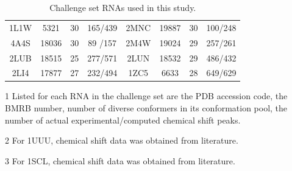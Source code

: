 \documentclass[journal=jcisd8,manuscript=article,layout=onecolumn]{achemso}
\begin{document}
\begin{table}[h!]
\begin{threeparttable}
\begin{tabular}{c c c c | c c c c}
1L1W & 5321  & 30 & 165/439 & 2MNC & 19887 & 30 & 100/248 \\
4A4S & 18036 & 30 & 89 /157 & 2M4W & 19024 & 29 & 257/261 \\
2LUB & 18515 & 25 & 277/571 & 2LUN & 18532 & 29 & 486/432 \\
2LI4 & 17877 & 27 & 232/494 & 1ZC5 & 6633  & 28 & 649/629 \\
\hline
\end{tabular}
\begin{tablenotes}
\item[1] Listed for each RNA in the challenge set are the PDB accession code, the BMRB number, number of diverse conformers in its conformation pool, the number of actual experimental/computed chemical shift peaks.
\item[2] For 1UUU, chemical shift data was obtained from literature\cite{sich1997structure}.
\item[3] For 1SCL, chemical shift data was obtained from literature\cite{szewczak1995sarcin}.

\end{tablenotes}
\end{threeparttable}
\caption{\label{tab:testing_set}  Challenge set RNAs used in this study.}
\end{table}
\end{document}
